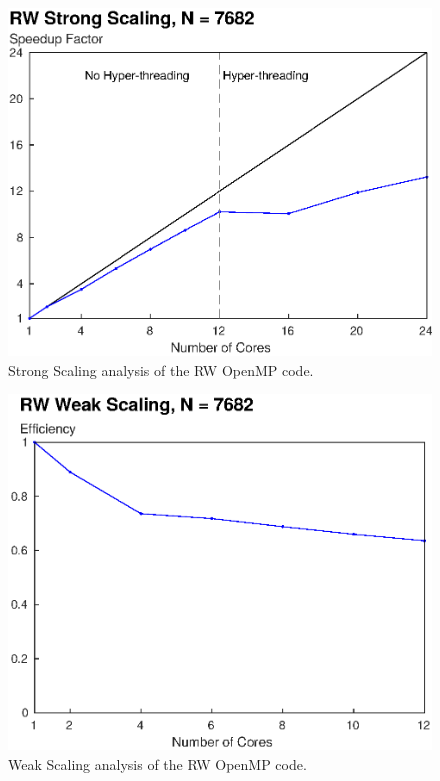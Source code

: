 \documentclass[letterpaper]{article}
\begin{document}
\begin{figure}\centering
  \includegraphics[width=\linewidth]{./plots/scaling_strong_RW_cropped.eps}
  \caption{Strong Scaling analysis of the RW OpenMP code.}
  \label{fig:scaling_strong_RW}
\end{figure}

\begin{figure}\centering
  \includegraphics[width=\linewidth]{./plots/scaling_weak_RW_cropped.eps}
  \caption{Weak Scaling analysis of the RW OpenMP code.}
  \label{fig:scaling_weak_RW}
\end{figure}
\end{document}
